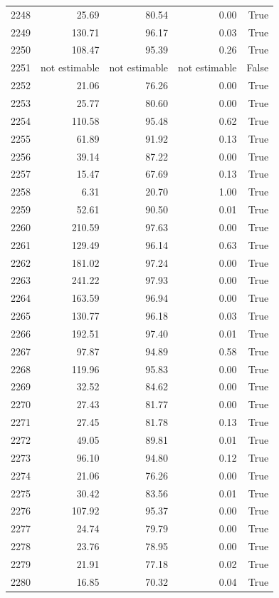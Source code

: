 \begin{longtable}{rrrrr}
2248 & 25.69 & 80.54 & 0.00 & True \\
2249 & 130.71 & 96.17 & 0.03 & True \\
2250 & 108.47 & 95.39 & 0.26 & True \\
2251 & not estimable & not estimable & not estimable & False \\
2252 & 21.06 & 76.26 & 0.00 & True \\
2253 & 25.77 & 80.60 & 0.00 & True \\
2254 & 110.58 & 95.48 & 0.62 & True \\
2255 & 61.89 & 91.92 & 0.13 & True \\
2256 & 39.14 & 87.22 & 0.00 & True \\
2257 & 15.47 & 67.69 & 0.13 & True \\
2258 & 6.31 & 20.70 & 1.00 & True \\
2259 & 52.61 & 90.50 & 0.01 & True \\
2260 & 210.59 & 97.63 & 0.00 & True \\
2261 & 129.49 & 96.14 & 0.63 & True \\
2262 & 181.02 & 97.24 & 0.00 & True \\
2263 & 241.22 & 97.93 & 0.00 & True \\
2264 & 163.59 & 96.94 & 0.00 & True \\
2265 & 130.77 & 96.18 & 0.03 & True \\
2266 & 192.51 & 97.40 & 0.01 & True \\
2267 & 97.87 & 94.89 & 0.58 & True \\
2268 & 119.96 & 95.83 & 0.00 & True \\
2269 & 32.52 & 84.62 & 0.00 & True \\
2270 & 27.43 & 81.77 & 0.00 & True \\
2271 & 27.45 & 81.78 & 0.13 & True \\
2272 & 49.05 & 89.81 & 0.01 & True \\
2273 & 96.10 & 94.80 & 0.12 & True \\
2274 & 21.06 & 76.26 & 0.00 & True \\
2275 & 30.42 & 83.56 & 0.01 & True \\
2276 & 107.92 & 95.37 & 0.00 & True \\
2277 & 24.74 & 79.79 & 0.00 & True \\
2278 & 23.76 & 78.95 & 0.00 & True \\
2279 & 21.91 & 77.18 & 0.02 & True \\
2280 & 16.85 & 70.32 & 0.04 & True \\

\end{longtable}
